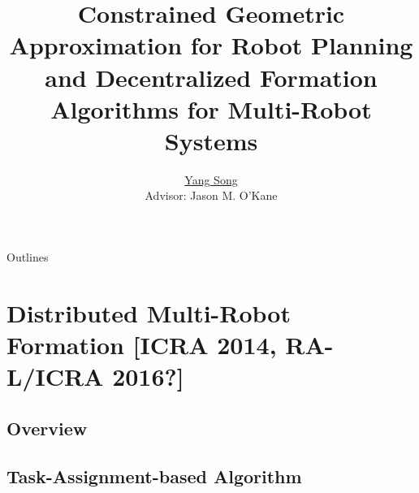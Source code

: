 \documentclass[10pt]{beamer}
\title[Ph.D. Defense]{Constrained Geometric Approximation for Robot Planning and  Decentralized Formation Algorithms for Multi-Robot Systems}
\author[Yang Song]{
  \underline{Yang Song}\\
  Advisor: Jason M. O'Kane
}
\institute[
USC
] %
{ %
  Dept. of Computer Science and Engineering\\
  University of South Carolina
  
}
\begin{document}
\begin{frame}
  \titlepage
\end{frame}
\begin{frame}{Outlines}{}
\tableofcontents
\end{frame}


\section{Distributed Multi-Robot Formation [ICRA 2014, RA-L/ICRA 2016?]}
\subsection[Overview]{Overview}

















\subsection[Lattice Formation]{Task-Assignment-based Algorithm}







\end{document}
